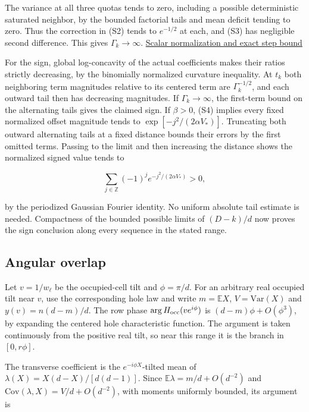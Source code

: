 The variance at all three quotas tends to zero, including a possible deterministic saturated neighbor, by the bounded factorial tails and mean deficit tending to zero. Thus the correction in (S2) tends to $e^{-1/2}$ at each, and (S3) has negligible second difference. This gives $\Gamma_k\to\infty$. \href{https://github.com/ProgramComputer/open-math-research/blob/04564a728c21eab6ce511b98a48ccaac754648ff/topics/balanced-arrays/very-tall/very-tall-upper-quota.md#the-last-od-quotas}{Scalar normalization and exact step bound}

For the sign, global log-concavity of the actual coefficients makes their ratios strictly decreasing, by the binomially normalized curvature inequality. At $t_k$ both neighboring term magnitudes relative to its centered term are $\Gamma_k^{-1/2}$, and each outward tail then has decreasing magnitudes. If $\Gamma_k\to\infty$, the first-term bound on the alternating tails gives the claimed sign. If $\beta>0$, (S4) implies every fixed normalized offset magnitude tends to $\exp[-j^2/(2\alpha V_*)]$. Truncating both outward alternating tails at a fixed distance bounds their errors by the first omitted terms. Passing to the limit and then increasing the distance shows the normalized signed value tends to

\begin{equation*}
\sum_{j\in\mathbb Z}(-1)^j e^{-j^2/(2\alpha V_*)}>0,
\end{equation*}

by the periodized Gaussian Fourier identity. No uniform absolute tail estimate is needed. Compactness of the bounded possible limits of $(D-k)/d$ now proves the sign conclusion along every sequence in the stated range.

\subsection{Angular overlap}

Let $v=1/w_\ell$ be the occupied-cell tilt and $\phi=\pi/d$. For an arbitrary real occupied tilt near $v$, use the corresponding hole law and write $m=\mathbb E X$, $V=\mathrm{Var}(X)$ and $y(v)=n(d-m)/d$. The row phase $\arg H_{\rm occ}(ve^{i\phi})$ is $(d-m)\phi+O(\phi^3)$, by expanding the centered hole characteristic function. The argument is taken continuously from the positive real tilt, so near this range it is the branch in $[0,r\phi]$.

The transverse coefficient is the $e^{-i\phi X}$-tilted mean of $\lambda(X)=X(d-X)/[d(d-1)]$. Since $\mathbb E\lambda=m/d+O(d^{-2})$ and $\mathrm{Cov}(\lambda,X)=V/d+O(d^{-2})$, with moments uniformly bounded, its argument is


